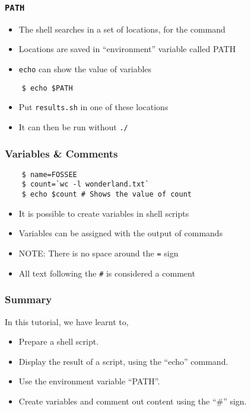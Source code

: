 \documentclass[12pt,compress]{beamer}
\begin{document}
\begin{frame}[fragile]
  \frametitle{\texttt{PATH}}
  \begin{itemize}
  \item The shell searches in a set of locations, for the command 
  \item Locations are saved in ``environment'' variable called PATH
  \item \texttt{echo} can show the value of variables
  \end{itemize}
  \begin{lstlisting}
    $ echo $PATH
  \end{lstlisting} %
  \begin{itemize}
  \item Put \texttt{results.sh} in one of these locations
  \item It can then be run without \texttt{./} 
  \end{itemize}
\end{frame}

\begin{frame}[fragile]
  \frametitle{Variables \& Comments}
  \begin{lstlisting}
    $ name=FOSSEE
    $ count=`wc -l wonderland.txt`
    $ echo $count # Shows the value of count
  \end{lstlisting} %
  \begin{itemize}
  \item It is possible to create variables in shell scripts
  \item Variables can be assigned with the output of commands
  \item \alert{NOTE:} There is no space around the \texttt{=} sign
  \item All text following the \texttt{\#} is considered a comment
  \end{itemize}
\end{frame}

\begin{frame}
\frametitle{Summary}
\label{sec-8}

  In this tutorial, we have learnt to,


\begin{itemize}
\item Prepare a shell script.
\item Display the result of a script, using the ``echo'' command.
\item Use the environment variable ``PATH''.
\item Create variables and comment out content using the ``\#'' sign.
\end{itemize}
\end{frame}
\end{document}
